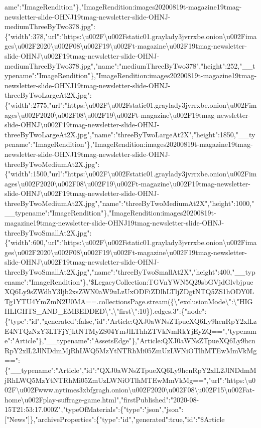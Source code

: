 ame":"ImageRendition"\},"ImageRendition:images20200819t-magazine19tmag-newsletter-slide-OHNJ19tmag-newsletter-slide-OHNJ-mediumThreeByTwo378.jpg":\{"width":378,"url":"https:\textbackslash{}u002F\textbackslash{}u002Fstatic01.graylady3jvrrxbe.onion\textbackslash{}u002Fimages\textbackslash{}u002F2020\textbackslash{}u002F08\textbackslash{}u002F19\textbackslash{}u002Ft-magazine\textbackslash{}u002F19tmag-newsletter-slide-OHNJ\textbackslash{}u002F19tmag-newsletter-slide-OHNJ-mediumThreeByTwo378.jpg","name":"mediumThreeByTwo378","height":252,"\_\_typename":"ImageRendition"\},"ImageRendition:images20200819t-magazine19tmag-newsletter-slide-OHNJ19tmag-newsletter-slide-OHNJ-threeByTwoLargeAt2X.jpg":\{"width":2775,"url":"https:\textbackslash{}u002F\textbackslash{}u002Fstatic01.graylady3jvrrxbe.onion\textbackslash{}u002Fimages\textbackslash{}u002F2020\textbackslash{}u002F08\textbackslash{}u002F19\textbackslash{}u002Ft-magazine\textbackslash{}u002F19tmag-newsletter-slide-OHNJ\textbackslash{}u002F19tmag-newsletter-slide-OHNJ-threeByTwoLargeAt2X.jpg","name":"threeByTwoLargeAt2X","height":1850,"\_\_typename":"ImageRendition"\},"ImageRendition:images20200819t-magazine19tmag-newsletter-slide-OHNJ19tmag-newsletter-slide-OHNJ-threeByTwoMediumAt2X.jpg":\{"width":1500,"url":"https:\textbackslash{}u002F\textbackslash{}u002Fstatic01.graylady3jvrrxbe.onion\textbackslash{}u002Fimages\textbackslash{}u002F2020\textbackslash{}u002F08\textbackslash{}u002F19\textbackslash{}u002Ft-magazine\textbackslash{}u002F19tmag-newsletter-slide-OHNJ\textbackslash{}u002F19tmag-newsletter-slide-OHNJ-threeByTwoMediumAt2X.jpg","name":"threeByTwoMediumAt2X","height":1000,"\_\_typename":"ImageRendition"\},"ImageRendition:images20200819t-magazine19tmag-newsletter-slide-OHNJ19tmag-newsletter-slide-OHNJ-threeByTwoSmallAt2X.jpg":\{"width":600,"url":"https:\textbackslash{}u002F\textbackslash{}u002Fstatic01.graylady3jvrrxbe.onion\textbackslash{}u002Fimages\textbackslash{}u002F2020\textbackslash{}u002F08\textbackslash{}u002F19\textbackslash{}u002Ft-magazine\textbackslash{}u002F19tmag-newsletter-slide-OHNJ\textbackslash{}u002F19tmag-newsletter-slide-OHNJ-threeByTwoSmallAt2X.jpg","name":"threeByTwoSmallAt2X","height":400,"\_\_typename":"ImageRendition"\},"\$LegacyCollection:TGVnYWN5Q29sbGVjdGlvbjpueXQ6Ly9sZWdhY3ljb2xsZWN0aW9uLzUxODFiZDlhLTljZDgtNTQ5ZS1hODY0LTg1YTU4YmZmN2U0MA==.collectionsPage.stream(\{\textbackslash{}"exclusionMode\textbackslash{}":\textbackslash{}"HIGHLIGHTS\_AND\_EMBEDDED\textbackslash{}",\textbackslash{}"first\textbackslash{}":10\}).edges.3":\{"node":\{"type":"id","generated":false,"id":"Article:QXJ0aWNsZTpueXQ6Ly9hcnRpY2xlLzE4NTQzNzY3LTFjYjktNTMyZS04YmJlLThhZTVkNmRkYjEyZQ==","typename":"Article"\},"\_\_typename":"AssetsEdge"\},"Article:QXJ0aWNsZTpueXQ6Ly9hcnRpY2xlL2JlNDdmMjRhLWQ5MzYtNTRhMi05ZmUzLWNiOTlhMTEwMmVkMg==":\{"\_\_typename":"Article","id":"QXJ0aWNsZTpueXQ6Ly9hcnRpY2xlL2JlNDdmMjRhLWQ5MzYtNTRhMi05ZmUzLWNiOTlhMTEwMmVkMg==","url":"https:\textbackslash{}u002F\textbackslash{}u002Fwww.nytimes3xbfgragh.onion\textbackslash{}u002F2020\textbackslash{}u002F08\textbackslash{}u002F15\textbackslash{}u002Fat-home\textbackslash{}u002Fplay-suffrage-game.html","firstPublished":"2020-08-15T21:53:17.000Z","typeOfMaterials":\{"type":"json","json":{[}"News"{]}\},"archiveProperties":\{"type":"id","generated":true,"id":"\$Article